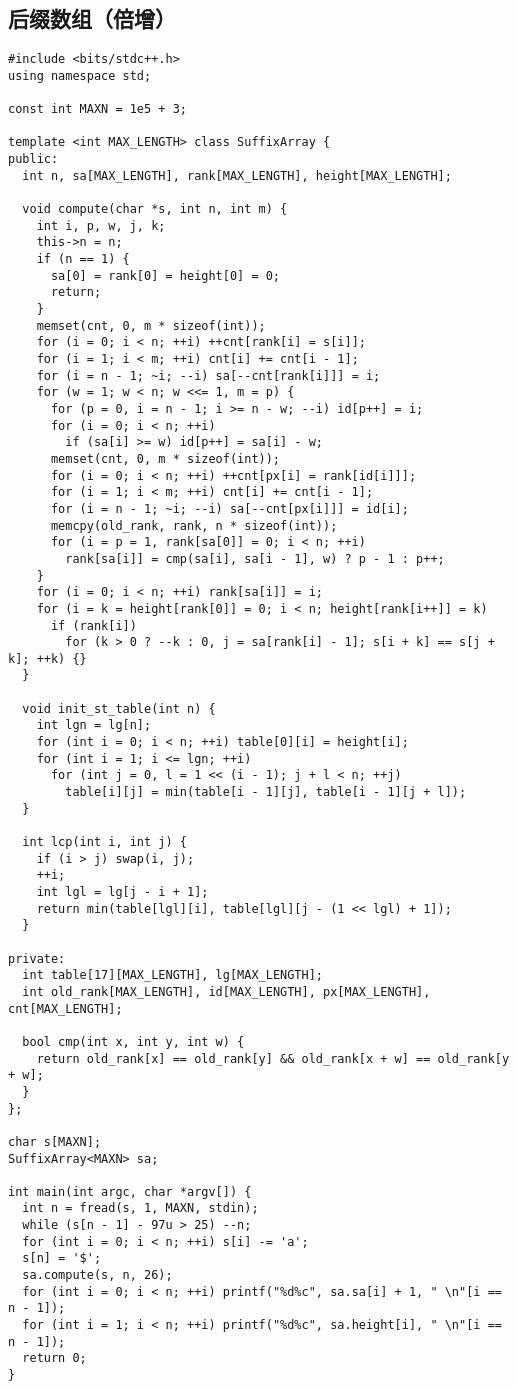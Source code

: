 \subsection{后缀数组（倍增）}
\begin{lstlisting}
#include <bits/stdc++.h>
using namespace std;

const int MAXN = 1e5 + 3;

template <int MAX_LENGTH> class SuffixArray {
public:
  int n, sa[MAX_LENGTH], rank[MAX_LENGTH], height[MAX_LENGTH];

  void compute(char *s, int n, int m) {
    int i, p, w, j, k;
    this->n = n;
    if (n == 1) {
      sa[0] = rank[0] = height[0] = 0;
      return;
    }
    memset(cnt, 0, m * sizeof(int));
    for (i = 0; i < n; ++i) ++cnt[rank[i] = s[i]];
    for (i = 1; i < m; ++i) cnt[i] += cnt[i - 1];
    for (i = n - 1; ~i; --i) sa[--cnt[rank[i]]] = i;
    for (w = 1; w < n; w <<= 1, m = p) {
      for (p = 0, i = n - 1; i >= n - w; --i) id[p++] = i;
      for (i = 0; i < n; ++i)
        if (sa[i] >= w) id[p++] = sa[i] - w;
      memset(cnt, 0, m * sizeof(int));
      for (i = 0; i < n; ++i) ++cnt[px[i] = rank[id[i]]];
      for (i = 1; i < m; ++i) cnt[i] += cnt[i - 1];
      for (i = n - 1; ~i; --i) sa[--cnt[px[i]]] = id[i];
      memcpy(old_rank, rank, n * sizeof(int));
      for (i = p = 1, rank[sa[0]] = 0; i < n; ++i)
        rank[sa[i]] = cmp(sa[i], sa[i - 1], w) ? p - 1 : p++;
    }
    for (i = 0; i < n; ++i) rank[sa[i]] = i;
    for (i = k = height[rank[0]] = 0; i < n; height[rank[i++]] = k)
      if (rank[i])
        for (k > 0 ? --k : 0, j = sa[rank[i] - 1]; s[i + k] == s[j + k]; ++k) {}
  }

  void init_st_table(int n) {
    int lgn = lg[n];
    for (int i = 0; i < n; ++i) table[0][i] = height[i];
    for (int i = 1; i <= lgn; ++i)
      for (int j = 0, l = 1 << (i - 1); j + l < n; ++j)
        table[i][j] = min(table[i - 1][j], table[i - 1][j + l]);
  }

  int lcp(int i, int j) {
    if (i > j) swap(i, j);
    ++i;
    int lgl = lg[j - i + 1];
    return min(table[lgl][i], table[lgl][j - (1 << lgl) + 1]);
  }

private:
  int table[17][MAX_LENGTH], lg[MAX_LENGTH];
  int old_rank[MAX_LENGTH], id[MAX_LENGTH], px[MAX_LENGTH], cnt[MAX_LENGTH];

  bool cmp(int x, int y, int w) {
    return old_rank[x] == old_rank[y] && old_rank[x + w] == old_rank[y + w];
  }
};

char s[MAXN];
SuffixArray<MAXN> sa;

int main(int argc, char *argv[]) {
  int n = fread(s, 1, MAXN, stdin);
  while (s[n - 1] - 97u > 25) --n;
  for (int i = 0; i < n; ++i) s[i] -= 'a';
  s[n] = '$';
  sa.compute(s, n, 26);
  for (int i = 0; i < n; ++i) printf("%d%c", sa.sa[i] + 1, " \n"[i == n - 1]);
  for (int i = 1; i < n; ++i) printf("%d%c", sa.height[i], " \n"[i == n - 1]);
  return 0;
}
\end{lstlisting}
